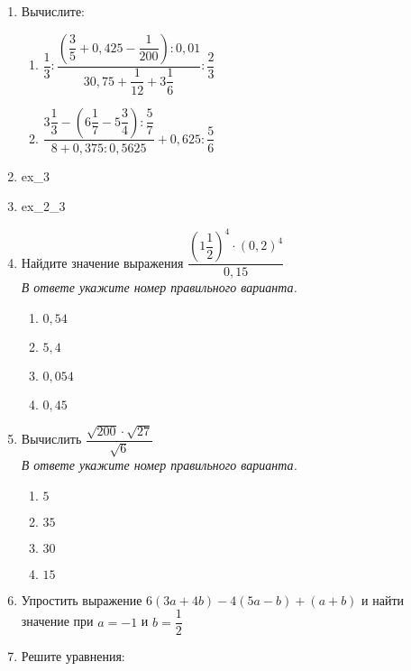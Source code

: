 \documentclass[12pt, a4paper]{article}
\begin{document}
	  
	\begin{enumerate}
		\item Вычислите:
		\begin{multicols}{2}
			\begin{enumerate}[label=\asbuk*)]
				\item $\dfrac{1}{3}:\dfrac{\left(\dfrac{3}{5}+0,425-\dfrac{1}{200}\right):0,01}{30,75+\dfrac{1}{12}+3\dfrac{1}{6}}:\dfrac{2}{3}$
				\item \( \dfrac{3\dfrac{1}{3}-\left(6\dfrac{1}{7}-5\dfrac{3}{4}\right):\dfrac{5}{7}}{8+0,375:0,5625}+0,625:\dfrac{5}{6} \)
			\end{enumerate}
		\end{multicols}
		\item {ex_3}
		\item {ex_2_3}
		\item Найдите значение выражения $\dfrac{\left(1\dfrac{1}{2}\right)^4\cdot(0,2)^4}{0,15}$\\
		\textit{В ответе укажите номер правильного варианта.}
		\begin{multicols}{4}
			\begin{enumerate}[label=\arabic*)]
				\item $0,54$
				\item $5,4$
				\item $0,054$
				\item $0,45$
			\end{enumerate}
		\end{multicols}
		\item Вычислить $\dfrac{\sqrt{200}\cdot\sqrt{27}}{\sqrt{6}}$\\
		\textit{В ответе укажите номер правильного варианта.}
		\begin{multicols}{4}
			\begin{enumerate}[label=\arabic*)]
				\item $5$
				\item $35$
				\item $30$
				\item $15$
			\end{enumerate}
		\end{multicols}
		\item Упростить выражение $6(3a+4b)-4(5a-b)+(a+b)$ и найти значение при $a=-1$ и $b=\dfrac{1}{2}$
		\item Решите уравнения:

\end{enumerate}
\end{document}
